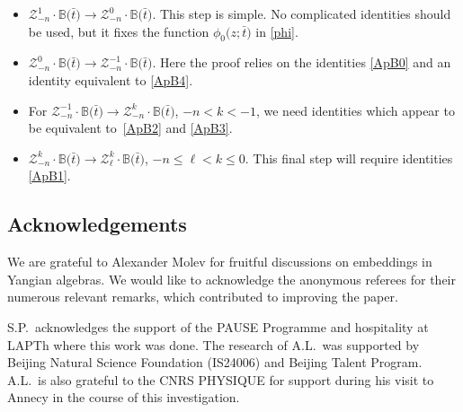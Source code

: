 \documentclass[pdftex]{sigma}
\newcommand{\bt}{{\bar t}}
\theoremstyle{definition}
\def\BB{{\mathbb{B}}}
\def\r#1{\eqref{#1}}
\def\Z{\mathcal{Z}}
\begin{document}
\begin{itemize}\itemsep=0pt
\item $\Z^1_{-n}\cdot\BB\bigl(\bt\bigr)\to \Z^0_{-n}\cdot\BB\bigl(\bt\bigr)$.
This step is simple. No complicated identities should be used, but it fixes the
function $\phi_0\bigl(z;\bt\bigr)$ in \r{phi}.
\item $\Z^0_{-n}\cdot\BB\bigl(\bt\bigr)\to \Z^{-1}_{-n}\cdot\BB\bigl(\bt\bigr)$.
Here the proof relies on the identities
\r{ApB0} and an identity equivalent to \r{ApB4}.
 \item For $\Z^{-1}_{-n}\cdot\BB\bigl(\bt\bigr)\to \Z^k_{-n}\cdot\BB\bigl(\bt\bigr)$, $-n<k< -1$,
 we need identities which appear to be equivalent to~\r{ApB2} and \r{ApB3}.
\item $\Z^k_{-n}\cdot\BB\bigl(\bt\bigr)\to \Z^k_{\ell}\cdot\BB\bigl(\bt\bigr)$, $-n\leq \ell< k\leq 0$.
This final step will require identities \r{ApB1}.
\end{itemize}



\subsection*{Acknowledgements}
We are grateful to Alexander Molev for fruitful discussions on embeddings in Yangian algebras.
We would like to acknowledge the anonymous referees for their numerous relevant remarks, which contributed to improving the paper.

S.P.~acknowledges the support of the PAUSE Programme and hospitality at LAPTh where
this work was done.
The research of A.L.\ was supported by Beijing Natural Science Foundation (IS24006) and Beijing Talent Program.
A.L.\ is also grateful to the CNRS PHYSIQUE for support during his visit to
Annecy in the course of this investigation.



\end{document}
